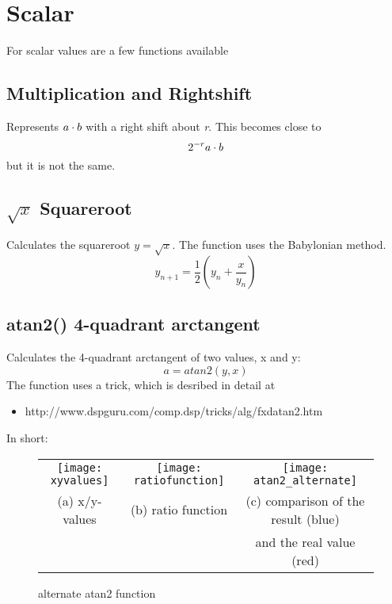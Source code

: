 \section{Scalar}
For scalar values are a few functions available

\subsection{Multiplication and Rightshift}
Represents $ a \cdot b $ with a right shift about \textit{r}. This becomes close to
\begin{equation}
2^{-r} a \cdot b
\end{equation}
but it is not the same.

\subsection{$\sqrt x$ Squareroot}
Calculates the squareroot $y = \sqrt x$. The function uses the Babylonian method.
\begin{equation}
y_{n+1} = \frac 1 2 \left( y_n + \frac{x}{y_n} \right)
\end{equation}

\subsection{atan2() 4-quadrant arctangent}
Calculates the 4-quadrant arctangent of two values, x and y:
\begin{equation}
a = atan2(y,x)
\end{equation}
The function uses a trick, which is desribed in detail at
\begin{itemize}
\item http://www.dspguru.com/comp.dsp/tricks/alg/fxdatan2.htm
\end{itemize}
In short:


\begin{figure}[h!]
	\centering
	\begin{tabular}{ccc}
	
		\begin{minipage}{4cm}
		\centering
		\texttt{[image: xyvalues]}
		\end{minipage}
	&
		\begin{minipage}{4cm}
		\centering
		\texttt{[image: ratiofunction]}
		\end{minipage}
	&
		\begin{minipage}{5cm}
		\centering
		\texttt{[image: atan2\_alternate]}
		\end{minipage}
	\\
		(a) x/y-values  &
		(b) ratio function & 
		(c) comparison of the result (blue)
	\\
		& & and the real value (red)
	\end{tabular}
	
	\caption{alternate atan2 function} \label{alternate atan2 function}
\end{figure}

